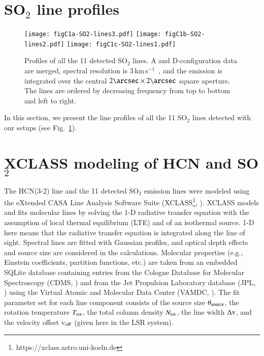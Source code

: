 \documentclass{aa}
\newcommand{\kms}{\,km\,s$^{-1}$~}
\begin{document}
\begin{appendix}
\section{SO$_2$ line profiles}
\label{so2profilesec}
\begin{figure}[h]
    \texttt{[image: figC1a-SO2-lines3.pdf]}\vspace{-2.17cm}
    \texttt{[image: figC1b-SO2-lines2.pdf]}\vspace{-2.16cm}
    \texttt{[image: figC1c-SO2-lines1.pdf]}
    \caption{Profiles of all the 11 detected SO$_2$ lines. A and
      D-configuration data are merged, spectral resolution is 3\kms,
      and the emission is integrated over the central $2\arcsec
      \times 2\arcsec$ square aperture. The lines are ordered by 
      decreasing frequency from top  to bottom and left to right.}
    \label{so2profiles}
\end{figure}

In this section, we present the line profiles of all the 11 SO$_2$
lines detected with our setups (see Fig.~\ref{so2profiles}).

\section{XCLASS modeling of HCN and SO$_2$}
\label{xclassmodels}

The HCN(3-2) line and the 11 detected SO$_2$ emission lines were
modeled using the eXtended CASA Line Analysis Software Suite
(XCLASS\footnote{https://xclass.astro.uni-koeln.de},
\citealt{moeller2017}). XCLASS models and fits molecular lines by
solving the 1-D radiative transfer equation with the assumption of
local thermal equilibrium (LTE) and of an isothermal source. 1-D here
means that the radiative transfer equation is integrated along the
line of sight. Spectral lines are fitted with Gaussian profiles, and
optical depth effects and source size are considered in the
calculations. Molecular properties (e.g., Einstein coefficients,
partition functions, etc.) are taken from an embedded SQLite database
containing entries from the Cologne Database for Molecular
Spectroscopy (CDMS, \citealt{cdms2001,cdms2005}) and from the Jet
Propulsion Laboratory database (JPL, \cite{JPL}) using the Virtual
Atomic and Molecular Data Center (VAMDC, \citealt{endres2016}). The
fit parameter set for each line component consists of the source size
$\theta_{\rm source}$, the rotation temperature $T_{\rm rot}$, the
total column density $N_{\rm tot}$, the line width $\Delta \rm{v}$,
and the velocity offset v$_{\rm off}$ (given here in the LSR system).


\end{appendix}
\end{document}
